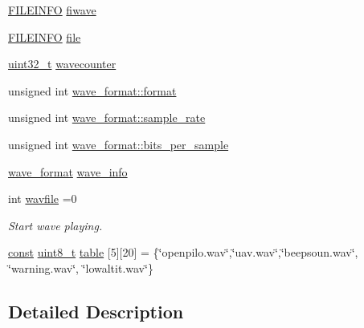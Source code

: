 \begin{DoxyCompactItemize}
\item 
\hyperlink{_common_2_libraries_2dosfs_2dosfs_8h_a276bdbc040c12591ba6227b280700ba5}{F\-I\-L\-E\-I\-N\-F\-O} \hyperlink{group___w_a_v_e_p_l_a_y_e_r___private___variables_gac9bc5ab0452e6a4f10de109bc847d6d5}{fiwave}
\item 
\hyperlink{_common_2_libraries_2dosfs_2dosfs_8h_a276bdbc040c12591ba6227b280700ba5}{F\-I\-L\-E\-I\-N\-F\-O} \hyperlink{group___w_a_v_e_p_l_a_y_e_r___private___variables_ga48b699d30a027a1d6326588c99d716e1}{file}
\item 
\hyperlink{stdint_8h_a435d1572bf3f880d55459d9805097f62}{uint32\-\_\-t} \hyperlink{group___w_a_v_e_p_l_a_y_e_r___private___variables_ga39e802dfcf3592a17543c656dba18064}{wavecounter}
\item 
unsigned int \hyperlink{group___w_a_v_e_p_l_a_y_e_r___private___variables_ga9d1757773fade2368a9707940f73a817}{wave\-\_\-format\-::format}
\item 
unsigned int \hyperlink{group___w_a_v_e_p_l_a_y_e_r___private___variables_gac4e6a65b9847e9764ced1595404b75fe}{wave\-\_\-format\-::sample\-\_\-rate}
\item 
unsigned int \hyperlink{group___w_a_v_e_p_l_a_y_e_r___private___variables_gad262ae00b4298e98bbbd565de116f390}{wave\-\_\-format\-::bits\-\_\-per\-\_\-sample}
\item 
\hyperlink{structwave__format}{wave\-\_\-format} \hyperlink{group___w_a_v_e_p_l_a_y_e_r___private___variables_ga174829d299c4713257749f20bfc996f4}{wave\-\_\-info}
\item 
int \hyperlink{group___w_a_v_e_p_l_a_y_e_r___private___variables_ga9fe4a9e502dfc977283819847ecc2351}{wavfile} =0
\begin{DoxyCompactList}\small\item\em Start wave playing. \end{DoxyCompactList}\item 
\hyperlink{group___n_a_m_e_ga7ae6d0e43244213b34de2c2b9aa30da6}{const} \hyperlink{stdint_8h_aba7bc1797add20fe3efdf37ced1182c5}{uint8\-\_\-t} \hyperlink{group___w_a_v_e_p_l_a_y_e_r___private___variables_gacad7ec90c8f694c87a4695350cb98d5d}{table} \mbox{[}5\mbox{]}\mbox{[}20\mbox{]} = \{\char`\"{}openpilo.\-wav\char`\"{},\char`\"{}uav.\-wav\char`\"{},\char`\"{}beepsoun.\-wav\char`\"{}, \char`\"{}warning.\-wav\char`\"{}, \char`\"{}lowaltit.\-wav\char`\"{}\}
\end{DoxyCompactItemize}


\subsection{Detailed Description}


